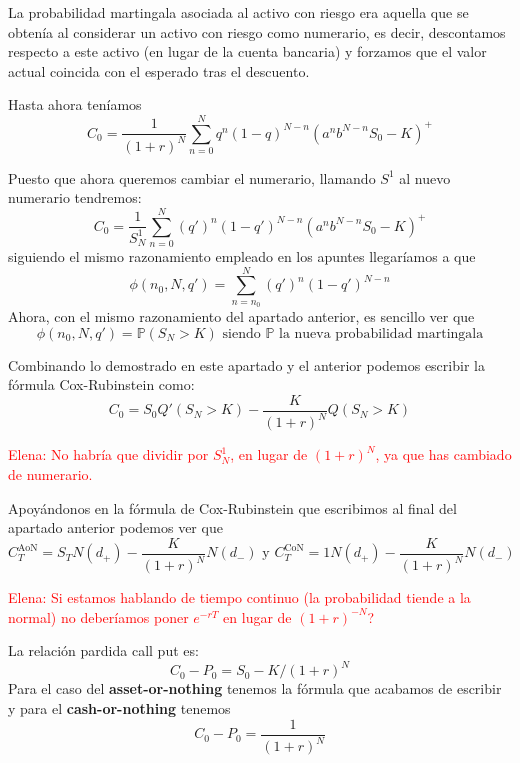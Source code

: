 \begin{problem}[1]
\spart

La probabilidad martingala asociada al activo con riesgo era aquella que se obtenía al considerar un activo con riesgo como numerario, es decir, descontamos respecto a este activo (en lugar de la cuenta bancaria) y forzamos que el valor actual coincida con el esperado tras el descuento.

Hasta ahora teníamos
\[C_0 = \frac{1}{(1+r)^N}\sum_{n=0}^Nq^n(1-q)^{N-n}(a^nb^{N-n}S_0-K)^+\]

Puesto que ahora queremos cambiar el numerario, llamando $S^1$ al nuevo numerario tendremos:
\[C_0 = \frac{1}{S^1_N}\sum_{n=0}^N(q')^n(1-q')^{N-n}(a^nb^{N-n}S_0-K)^+\]
siguiendo el mismo razonamiento empleado en los apuntes llegaríamos a que
\[\phi(n_0,N,q') = \sum_{n=n_0}^N(q')^n(1-q')^{N-n}\]
Ahora, con el mismo razonamiento del apartado anterior, es sencillo ver que
\[\phi(n_0,N,q') = \mathbb{P}(S_N>K) \text{ siendo } \mathbb{P} \text{ la nueva probabilidad martingala}\]

Combinando lo demostrado en este apartado y el anterior podemos escribir la fórmula Cox-Rubinstein como:
\[C_0=S_0Q'(S_N>K) - \frac{K}{(1+r)^N}Q(S_N>K)\]

\textcolor{red}{Elena: No habría que dividir por $S^{1}_{N}$, en lugar de $(1+r)^N$, ya que has cambiado de numerario.}\\
\spart

Apoyándonos en la fórmula de Cox-Rubinstein que escribimos al final del apartado anterior podemos ver que
\[C_T^{\text{AoN}}=S_TN(d_+)-\frac{K}{(1+r)^N}N(d_-) \text{ y } C_T^{\text{CoN}}=1N(d_+)-\frac{K}{(1+r)^N}N(d_-)\]

\textcolor{red}{Elena: Si estamos hablando de tiempo continuo (la probabilidad tiende a la normal) no deberíamos poner $e^{-rT}$ en lugar de $(1+r)^{-N}$?}


\spart

La relación pardida call put es:
\[C_0-P_0=S_0-K/(1+r)^N\]
Para el caso del \textbf{asset-or-nothing} tenemos la fórmula que acabamos de escribir y para el \textbf{cash-or-nothing} tenemos
\[C_0-P_0=\frac{1}{(1+r)^N}\]

\end{problem}

